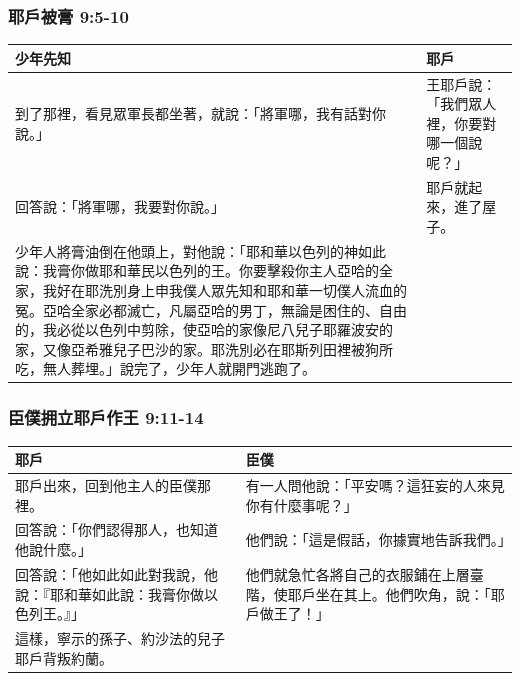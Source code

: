 \subsubsection{耶戶被膏 9:5-10}
\begin{tabular}{p{}|p{}}\hline
少年先知&耶戶\\\hline\hline
到了那裡，看見眾軍長都坐著，就說：「將軍哪，我有話對你說。」&王耶戶說：「我們眾人裡，你要對哪一個說呢？」\\\hline
回答說：「將軍哪，我要對你說。」&耶戶就起來，進了屋子。\\\hline
少年人將膏油倒在他頭上，對他說：「耶和華以色列的神如此說：我膏你做耶和華民以色列的王。你要擊殺你主人亞哈的全家，我好在耶洗別身上申我僕人眾先知和耶和華一切僕人流血的冤。亞哈全家必都滅亡，凡屬亞哈的男丁，無論是困住的、自由的，我必從以色列中剪除，使亞哈的家像尼八兒子耶羅波安的家，又像亞希雅兒子巴沙的家。耶洗別必在耶斯列田裡被狗所吃，無人葬埋。」說完了，少年人就開門逃跑了。&\\\hline
\end{tabular}
 

\subsubsection{臣僕拥立耶戶作王 9:11-14}
\begin{tabular}{p{}|p{}}\hline
耶戶&臣僕\\\hline\hline
耶戶出來，回到他主人的臣僕那裡。&有一人問他說：「平安嗎？這狂妄的人來見你有什麼事呢？」\\\hline
回答說：「你們認得那人，也知道他說什麼。」&他們說：「這是假話，你據實地告訴我們。」\\\hline
回答說：「他如此如此對我說，他說：『耶和華如此說：我膏你做以色列王。』」&他們就急忙各將自己的衣服鋪在上層臺階，使耶戶坐在其上。他們吹角，說：「耶戶做王了！」\\\hline
這樣，寧示的孫子、約沙法的兒子耶戶背叛約蘭。&\\\hline
\end{tabular}


